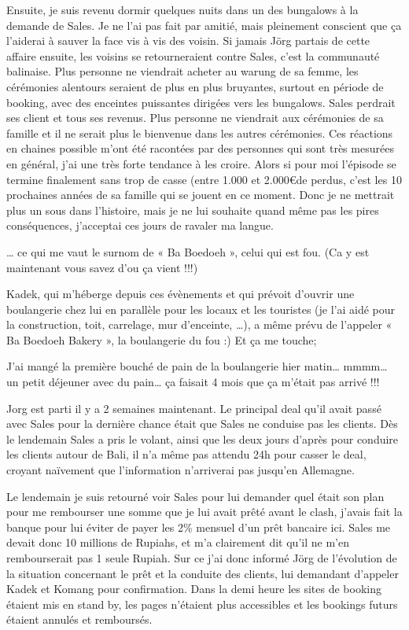 Ensuite, je suis revenu dormir quelques nuits dans un des bungalows à la demande de Sales. Je ne l’ai pas fait par amitié, mais pleinement conscient que ça l’aiderai à sauver la face vis à vis des voisin. Si jamais Jörg partais de cette affaire ensuite, les voisins se retourneraient contre Sales, c’est la communauté balinaise. Plus personne ne viendrait acheter au warung de sa femme, les cérémonies alentours seraient de plus en plus bruyantes, surtout en période de booking, avec des enceintes puissantes dirigées vers les bungalows. Sales perdrait ses client et tous ses revenus. Plus personne ne viendrait aux cérémonies de sa famille et il ne serait plus le bienvenue dans les autres cérémonies. Ces réactions en chaines possible m’ont été racontées par des personnes qui sont très mesurées en général, j’ai une très forte tendance à les croire. Alors si pour moi l’épisode se termine finalement sans trop de casse (entre 1.000 et 2.000\euro  de perdus, c’est les 10 prochaines années de sa famille qui se jouent en ce moment. Donc je ne mettrait plus un sous dans l’histoire, mais je ne lui souhaite quand même pas les pires conséquences, j’acceptai ces jours de ravaler ma langue.

… ce qui me vaut le surnom de « Ba Boedoeh », celui qui est fou. (Ca y est maintenant vous savez d’ou ça vient !!!)

Kadek, qui m’héberge depuis ces évènements et qui prévoit d’ouvrir une boulangerie chez lui en parallèle pour les locaux et les touristes (je l’ai aidé pour la construction, toit, carrelage, mur d’enceinte, …), a même prévu de l’appeler « Ba Boedoeh Bakery », la boulangerie du fou :) Et ça me touche;

J’ai mangé la première bouché de pain de la boulangerie hier matin… mmmm… un petit déjeuner avec du pain… ça faisait 4 mois que ça m’était pas arrivé !!!

Jorg est parti il y a 2 semaines maintenant. Le principal deal qu’il avait passé avec Sales pour la dernière chance était que Sales ne conduise pas les clients. Dès le lendemain Sales a pris le volant, ainsi que les deux jours d’après pour conduire les clients autour de Bali, il n’a même pas attendu 24h pour casser le deal, croyant naïvement que l’information n’arriverai pas jusqu’en Allemagne.

Le lendemain je suis retourné voir Sales pour lui demander quel était son plan pour me rembourser une somme que je lui avait prêté avant le clash, j’avais fait la banque pour lui éviter de payer les 2\% mensuel d’un prêt bancaire ici. Sales me devait donc 10 millions de Rupiahs, et m’a clairement dit qu’il ne m’en rembourserait pas 1 seule Rupiah. Sur ce j’ai donc informé Jörg de l’évolution de la situation concernant le prêt et la conduite des clients, lui demandant d’appeler Kadek et Komang pour confirmation. Dans la demi heure les sites de booking étaient mis en stand by, les pages n’étaient plus accessibles et les bookings futurs étaient annulés et remboursés.

